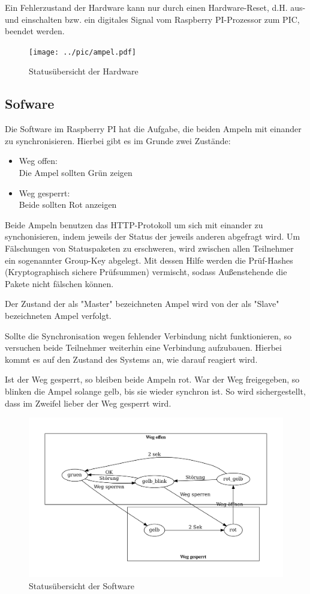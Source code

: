 \documentclass[a4paper, ngerman]{scrartcl}
\begin{document}
Ein Fehlerzustand der Hardware kann nur durch einen Hardware-Reset, d.H. aus- und einschalten bzw. ein digitales Signal vom Raspberry PI-Prozessor zum PIC, beendet werden.

\begin{figure}
	\texttt{[image: ../pic/ampel.pdf]}
	\caption{Statusübersicht der Hardware}
\end{figure}

\subsection{Sofware}
Die Software im Raspberry PI hat die Aufgabe, die beiden Ampeln mit einander zu synchronisieren. Hierbei gibt es im Grunde zwei Zustände:
\begin{itemize}
	\item Weg offen:\\
		Die Ampel sollten Grün zeigen
	\item Weg gesperrt:\\
		Beide sollten Rot anzeigen
\end{itemize}

Beide Ampeln benutzen das HTTP-Protokoll um sich mit einander zu synchonisieren, indem jeweils der Status der jeweils anderen abgefragt wird. Um Fälschungen von Statuspaketen zu erschweren, wird zwischen allen Teilnehmer ein sogenannter Group-Key abgelegt. Mit dessen Hilfe werden die Prüf-Hashes (Kryptographisch sichere Prüfsummen) vermischt, sodass Außenstehende die Pakete nicht fälschen können.

Der Zustand der als "Master" bezeichneten Ampel wird von der als "Slave" bezeichneten Ampel verfolgt. 

Sollte die Synchronisation wegen fehlender Verbindung nicht funktionieren, so versuchen beide Teilnehmer weiterhin eine Verbindung aufzubauen. Hierbei kommt es auf den Zustand des Systems an, wie darauf reagiert wird.

Ist der Weg gesperrt, so bleiben beide Ampeln rot. War der Weg freigegeben, so blinken die Ampel solange gelb, bis sie wieder synchron ist. So wird sichergestellt, dass im Zweifel lieber der Weg gesperrt wird.

\begin{figure}
	\includegraphics[keepaspectratio, width=\textwidth]{system_statemachine.pdf}
	\caption{Statusübersicht der Software}
\end{figure}
\end{document}
